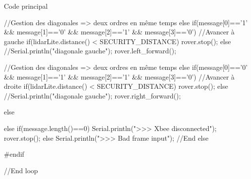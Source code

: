 \begin{Cpp}{Code principal}
{{    //Gestion des diagonales => deux ordres en même temps    
    else if(message[0]=='1' && message[1]=='0' && message[2]=='1' && message[3]=='0') //Avancer à gauche
    {
    if(lidarLite.distance() < SECURITY_DISTANCE)
      {
        rover.stop();
      }
      else
      {
        //Serial.println("diagonale gauche");
       rover.left_forward();
      }             
    }

    //Gestion des diagonales => deux ordres en même temps    
    else if(message[0]=='0' && message[1]=='1' && message[2]=='1' && message[3]=='0') //Avancer à droite
    {
      if(lidarLite.distance() < SECURITY_DISTANCE)
      {
        rover.stop();
      }
      else
      {
        //Serial.println("diagonale gauche");
       rover.right_forward();
      }   
    }    

    else {}
     
  }
  else if(message.length()==0)
  {
    Serial.println(">>> Xbee disconnected");
    rover.stop();
  }
  else 
  {
    Serial.println(">>> Bad frame input");
  }//End else

  
#endif

}//End loop

\end{Cpp}

